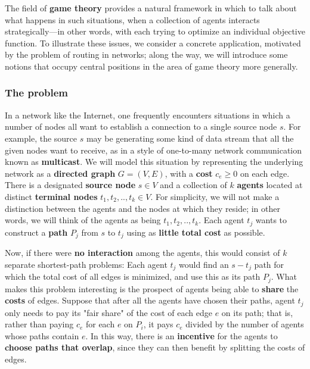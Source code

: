 The field of \textbf{game theory} provides a natural framework in which to talk about what happens in such situations, when a collection of agents interacts strategically—in other words, with each trying to optimize an individual objective function. To illustrate these issues, we consider a concrete application, motivated by the problem of routing in networks; along the way, we will introduce some notions that occupy central positions in the area of game theory more generally.

\subsubsection{The problem}
In a network like the Internet, one frequently encounters situations in which a number of nodes all want to establish a connection to a single source node $s$. For example, the source $s$ may be generating some kind of data stream that all the given nodes want to receive, as in a style of one-to-many network communication known as \textbf{multicast}. We will model this situation by representing the underlying network as a \textbf{directed graph} $G = (V, E)$, with a \textbf{cost} $c_e \geq 0$ on each edge. There is a designated \textbf{source node} $s \in V$ and a collection of $k$ \textbf{agents} located at distinct \textbf{terminal nodes} $t_1, t_2, .., t_k \in V$. For simplicity, we will not make a distinction between the agents and the nodes at which they reside; in other words, we will think of the agents as being $t_1, t_2, .., t_k$. Each agent $t_j$ wants to construct a \textbf{path} $P_j$ from $s$ to $t_j$ using as \textbf{little total cost} as possible. 

Now, if there were \textbf{no interaction} among the agents, this would consist of $k$ separate shortest-path problems: Each agent $t_j$ would find an $s-t_j$ path for which the total cost of all edges is minimized, and use this as its path $P_j$. What makes this problem interesting is the prospect of agents being able to \textbf{share} the \textbf{costs} of edges. Suppose that after all the agents have chosen their paths, agent $t_j$ only needs to pay its "fair share" of the cost of each edge $e$ on its path; that is, rather than paying $c_e$ for each $e$ on $P_i$, it pays $c_e$ divided by the number of agents whose paths contain $e$. In this way, there is an \textbf{incentive} for the agents to \textbf{choose paths that overlap}, since they can then benefit by splitting the costs of edges. 


